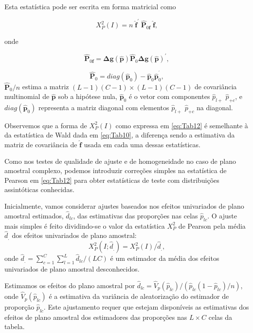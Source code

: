 \documentclass[]{book}
\numberwithin{example}{chapter}
\numberwithin{remark}{chapter}
\numberwithin{definition}{chapter}
\begin{document}
Esta estatística pode ser escrita em forma matricial como

\begin{equation}
X_{P}^{2}\left( I\right) =n\;\mathbf{\hat{f}}^{\prime }\;\widehat{\mathbf{P}}
_{0\mathbf{f}}\;\mathbf{\hat{f}},  \label{eq:Tab12}
\end{equation}

onde

\begin{equation}
\widehat{\mathbf{P}}_{0\mathbf{f}}=\mathbf{\Delta g}\left( \mathbf{\hat{p}}
\right) \mathbf{\hat{P}}_{0}\mathbf{\Delta g}\left( \mathbf{\hat{p}}\right)
^{\prime },  \label{eq:Tab13}
\end{equation}

\[
\mathbf{\hat{P}}_{0}=diag\left( \mathbf{\hat{p}}_{0}\right) -\mathbf{\hat{p}}
_{0}\mathbf{\hat{p}}_{0}^{^{\prime }}, 
\] \(\widehat{\mathbf{P}}_{0}/n\) estima a matriz
\(\left( L-1\right) \left( C-1\right) \times \left( L-1\right) \left( C-1\right)\)
de covariância multinomial de \(\mathbf{\hat{p}}\) sob a hipótese nula,
\(\mathbf{\hat{p}}_{0}\) é o vetor com componentes \(\hat{p}_{l+}\)
\(\hat{p}_{+c}\), e \(diag\left( \mathbf{\hat{p}}_{0}\right)\)
representa a matriz diagonal com elementos \(\hat{p}_{l+}\)
\(\hat{p}_{+c}\) na diagonal.

Observemos que a forma de \(X_{P}^{2}\left( I\right)\) como expressa em
\eqref{eq:Tab12} é semelhante à da estatística de Wald dada em
\eqref{eq:Tab10}, a diferença sendo a estimativa da matriz de covariância
de \(\mathbf{\hat{f}}\) usada em cada uma dessas estatísticas.

Como nos testes de qualidade de ajuste e de homogeneidade no caso de
plano amostral complexo, podemos introduzir correções simples na
estatística de Pearson em \eqref{eq:Tab12} para obter estatísticas de
teste com distribuições assintóticas conhecidas.

Inicialmente, vamos considerar ajustes baseados nos efeitos univariados
de plano amostral estimados, \(\hat{d}_{lc}\), das estimativas das
proporções nas celas \(\hat{p}_{lc}\). O ajuste mais simples é feito
dividindo-se o valor da estatística \(X_{P}^{2}\) de Pearson pela média
\(\hat{d}_{.}\) dos efeitos univariados de plano amostral: \[
X_{P}^{2}\left( I;\hat{d}_{.}\right) =X_{P}^{2}\left( I\right) /\hat{d}
_{.}, 
\] onde
\(\hat{d}_{.}=\sum_{c=1}^{C}\sum_{l=1}^{L}\hat{d}_{lc}/\left( LC\right)\)
é um estimador da média dos efeitos univariados de plano amostral
desconhecidos.

Estimamos os efeitos do plano amostral por
\(\hat{d}_{lc}=\hat{V}_{p}\left(\hat{p}_{lc}\right) /\left( \hat{p}_{lc}\left( 1-\hat{p}_{lc}\right) /n\right)\),
onde \(\hat{V}_{p}\left( \hat{p}_{lc}\right)\) é a estimativa da
variância de aleatorização do estimador de proporção \(\hat{p}_{lc}\).
Este ajustamento requer que estejam disponíveis as estimativas dos
efeitos de plano amostral dos estimadores das proporções nas
\(L\times C\) celas da tabela.
\end{document}
